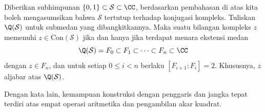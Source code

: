 \begin{theorem}\label{prop:characterization-constructible}
	Diberikan subhimpunan $\{0, 1\} \subset \mathcal{S} \subset \CC$, berdasarkan pembahasan di atas kita boleh mengasumsikan bahwa $\mathcal{S}$ tertutup terhadap konjugasi kompleks. Tuliskan $\Q(\mathcal{S})$ untuk submedan yang dibangkitkannya. Maka suatu bilangan kompleks $z$ memenuhi $z \in \mathrm{Con}(\mathcal{S})$ jika dan hanya jika terdapat menara ekstensi medan
	\[ \Q(\mathcal{S}) = F_0 \subset F_1 \subset \cdots \subset F_n \subset \CC \]
	dengan $z \in F_n$, dan untuk setiap $0 \leq i < n$ berlaku $[F_{i+1} : F_i] = 2$. Khususnya, $z$ aljabar atas $\Q(\mathcal{S})$.
\end{theorem}
Dengan kata lain, kemampuan konstruksi dengan penggaris dan jangka tepat terdiri atas empat operasi aritmetika dan pengambilan akar kuadrat.
